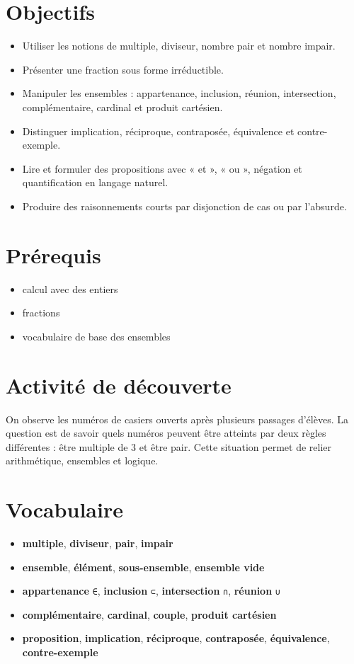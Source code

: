 \section{Objectifs}

\begin{itemize}
\item Utiliser les notions de multiple, diviseur, nombre pair et nombre impair.
\item Présenter une fraction sous forme irréductible.
\item Manipuler les ensembles : appartenance, inclusion, réunion, intersection, complémentaire, cardinal et produit cartésien.
\item Distinguer implication, réciproque, contraposée, équivalence et contre-exemple.
\item Lire et formuler des propositions avec « et », « ou », négation et quantification en langage naturel.
\item Produire des raisonnements courts par disjonction de cas ou par l'absurde.
\end{itemize}

\section{Prérequis}

\begin{itemize}
\item calcul avec des entiers
\item fractions
\item vocabulaire de base des ensembles
\end{itemize}

\section{Activité de découverte}

On observe les numéros de casiers ouverts après plusieurs passages d'élèves. La question est de savoir quels numéros peuvent être atteints par deux règles différentes : être multiple de 3 et être pair. Cette situation permet de relier arithmétique, ensembles et logique.

\section{Vocabulaire}

\begin{itemize}
\item \textbf{multiple}, \textbf{diviseur}, \textbf{pair}, \textbf{impair}
\item \textbf{ensemble}, \textbf{élément}, \textbf{sous-ensemble}, \textbf{ensemble vide}
\item \textbf{appartenance} \texttt{∈}, \textbf{inclusion} \texttt{⊂}, \textbf{intersection} \texttt{∩}, \textbf{réunion} \texttt{∪}
\item \textbf{complémentaire}, \textbf{cardinal}, \textbf{couple}, \textbf{produit cartésien}
\item \textbf{proposition}, \textbf{implication}, \textbf{réciproque}, \textbf{contraposée}, \textbf{équivalence}, \textbf{contre-exemple}
\end{itemize}

